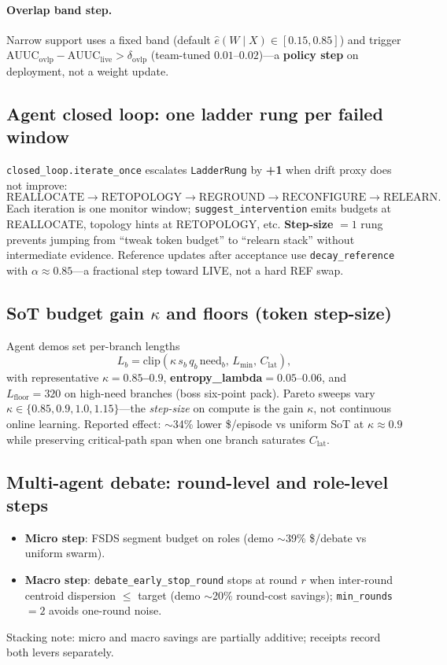\documentclass[11pt]{article}
\begin{document}
\paragraph{Overlap band step.}
Narrow support uses a fixed band (default $\hat e(W\mid X)\in[0.15,0.85]$) and trigger $\mathrm{AUUC}_{\mathrm{ovlp}}-\mathrm{AUUC}_{\mathrm{live}}>\delta_{\mathrm{ovlp}}$ (team-tuned $0.01$--$0.02$)---a \textbf{policy step} on deployment, not a weight update.

\subsection{Agent closed loop: one ladder rung per failed window}
\texttt{closed\_loop.iterate\_once} escalates \texttt{LadderRung} by \textbf{+1} when drift proxy does not improve:
\[
\text{REALLOCATE} \to \text{RETOPOLOGY} \to \text{REGROUND} \to \text{RECONFIGURE} \to \text{RELEARN}.
\]
Each iteration is one monitor window; \texttt{suggest\_intervention} emits budgets at REALLOCATE, topology hints at RETOPOLOGY, etc.
\textbf{Step-size} $=1$ rung prevents jumping from ``tweak token budget'' to ``relearn stack'' without intermediate evidence.
Reference updates after acceptance use \texttt{decay\_reference} with $\alpha\approx 0.85$---a fractional step toward LIVE, not a hard REF swap.

\subsection{SoT budget gain $\kappa$ and floors (token step-size)}
Agent demos set per-branch lengths
\[
L_b = \mathrm{clip}(\kappa\, s_b\, q_b\, \mathrm{need}_b,\, L_{\min},\, C_{\mathrm{lat}}),
\]
with representative \textbf{$\kappa=0.85$--$0.9$}, \textbf{entropy\_lambda}$=0.05$--$0.06$, and \textbf{$L_{\mathrm{floor}}=320$} on high-need branches (boss six-point pack).
Pareto sweeps vary $\kappa\in\{0.85,0.9,1.0,1.15\}$---the \emph{step-size} on compute is the gain $\kappa$, not continuous online learning.
Reported effect: $\sim$34\% lower \$/episode vs uniform SoT at $\kappa\approx 0.9$ while preserving critical-path span when one branch saturates $C_{\mathrm{lat}}$.

\subsection{Multi-agent debate: round-level and role-level steps}
\begin{itemize}[nosep]
  \item \textbf{Micro step}: FSDS segment budget on roles (demo $\sim$39\% \$/debate vs uniform swarm).
  \item \textbf{Macro step}: \texttt{debate\_early\_stop\_round} stops at round $r$ when inter-round centroid dispersion $\le$ target (demo $\sim$20\% round-cost savings); \texttt{min\_rounds}$=2$ avoids one-round noise.
\end{itemize}
Stacking note: micro and macro savings are partially additive; receipts record both levers separately.
\end{document}

